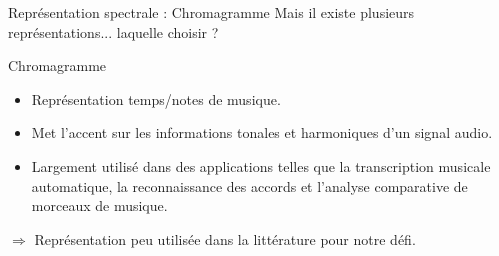 \documentclass[compress,xcolor=table]{beamer}
\begin{document}
\begin{frame}{Représentation spectrale : Chromagramme}
    Mais il existe plusieurs représentations... laquelle choisir ?

    \begin{block}{Chromagramme}

        \begin{itemize}
            \item Représentation temps/notes de musique.
            \item Met l'accent sur les informations tonales et harmoniques d'un signal audio.
            \item Largement utilisé dans des applications telles que la transcription musicale automatique, la reconnaissance des accords et l'analyse comparative de morceaux de musique.
        \end{itemize}

    \end{block}

    $\Rightarrow$ Représentation peu utilisée dans la littérature pour notre défi.

\end{frame}
\end{document}
